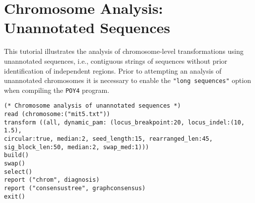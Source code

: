 \section{Chromosome Analysis: Unannotated Sequences}{\label{tutorial 4}}

This tutorial illustrates the analysis of chromosome-level transformations using 
unannotated sequences, i.e., contiguous strings of sequences without prior 
identification of independent regions. Prior to attempting an analysis of  
unannotated chromosomes it is necessary to enable the \texttt {"long sequences"}
option when compiling the \texttt{POY4} program. 

\begin{verbatim}
(* Chromosome analysis of unannotated sequences *)
read (chromosome:("mit5.txt"))
transform ((all, dynamic_pam: (locus_breakpoint:20, locus_indel:(10, 1.5), 
circular:true, median:2, seed_length:15, rearranged_len:45,
sig_block_len:50, median:2, swap_med:1)))
build()
swap()
select()
report ("chrom", diagnosis)
report ("consensustree", graphconsensus)
exit()
\end{verbatim}


